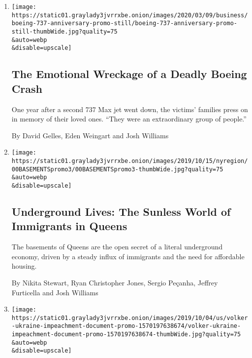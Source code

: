 \begin{enumerate}
\def\labelenumi{\arabic{enumi}.}
\item
  \href{/interactive/2020/03/09/business/boeing-737-crash-anniversary.html}{}

  \texttt{[image: https://static01.graylady3jvrrxbe.onion/images/2020/03/09/business/boeing-737-anniversary-promo-still/boeing-737-anniversary-promo-still-thumbWide.jpg?quality=75\\\&auto=webp\\\&disable=upscale]}

  \hypertarget{the-emotional-wreckage-of-a-deadly-boeing-crash}{%
  \subsection{The Emotional Wreckage of a Deadly Boeing
  Crash}\label{the-emotional-wreckage-of-a-deadly-boeing-crash}}

  One year after a second 737 Max jet went down, the victims' families
  press on in memory of their loved ones. ``They were an extraordinary
  group of people.''

  By David Gelles, Eden Weingart and Josh Williams
\item
  \href{/interactive/2019/10/23/nyregion/basements-queens-immigrants.html}{}

  \texttt{[image: https://static01.graylady3jvrrxbe.onion/images/2019/10/15/nyregion/00BASEMENTSpromo3/00BASEMENTSpromo3-thumbWide.jpg?quality=75\\\&auto=webp\\\&disable=upscale]}

  \hypertarget{underground-lives-the-sunless-world-of-immigrants-in-queens}{%
  \subsection{Underground Lives: The Sunless World of Immigrants in
  Queens}\label{underground-lives-the-sunless-world-of-immigrants-in-queens}}

  The basements of Queens are the open secret of a literal underground
  economy, driven by a steady influx of immigrants and the need for
  affordable housing.

  By Nikita Stewart, Ryan Christopher Jones, Sergio Peçanha, Jeffrey
  Furticella and Josh Williams
\item
  \href{/interactive/2019/10/04/us/politics/ukraine-text-messages-volker.html}{}

  \texttt{[image: https://static01.graylady3jvrrxbe.onion/images/2019/10/04/us/volker-ukraine-impeachment-document-promo-1570197638674/volker-ukraine-impeachment-document-promo-1570197638674-thumbWide.jpg?quality=75\\\&auto=webp\\\&disable=upscale]}


\end{enumerate}
